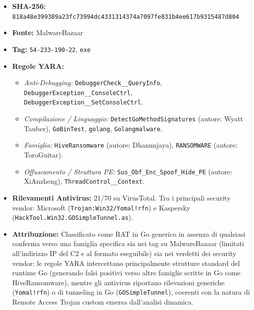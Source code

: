 \documentclass[11pt, a4paper]{article}
\begin{document}
	\begin{itemize}
		\item \textbf{SHA-256:} {\small\texttt{818a48e399389a23fc73994dc4331314374a7097fe831b4ee617b9315487d804}}
		\item \textbf{Fonte:} MalwareBazaar
		\item \textbf{Tag:} \texttt{54-\allowbreak{}233-\allowbreak{}190-\allowbreak{}22}, \texttt{exe}
		\item \textbf{Regole YARA:}
		\begin{itemize}
			\item \textit{Anti-Debugging:} \texttt{Debugger\allowbreak{}Check\_\_\allowbreak{}Query\allowbreak{}Info}, \texttt{Debugger\allowbreak{}Exception\_\_\allowbreak{}Console\allowbreak{}Ctrl}, \texttt{Debugger\allowbreak{}Exception\_\_\allowbreak{}Set\allowbreak{}Console\allowbreak{}Ctrl}.
			\item \textit{Compilazione / Linguaggio:} \texttt{Detect\allowbreak{}Go\allowbreak{}Method\allowbreak{}Signatures} (autore: Wyatt Tauber), \texttt{GoBinTest}, \texttt{golang}, \texttt{Golangmalware}.
			\item \textit{Famiglia:} \texttt{Hive\allowbreak{}Ransomware} (autore: Dhanunjaya), \texttt{RANSOMWARE} (autore: ToroGuitar).
			\item \textit{Offuscamento / Struttura PE:} \texttt{Sus\_\allowbreak{}Obf\_\allowbreak{}Enc\_\allowbreak{}Spoof\_\allowbreak{}Hide\_\allowbreak{}PE} (autore: XiAnzheng), \texttt{Thread\allowbreak{}Control\_\_\allowbreak{}Context}.
		\end{itemize}
		\item \textbf{Rilevamenti Antivirus:} 21/70 su VirusTotal. Tra i principali security vendor: Microsoft (\texttt{Trojan:Win32/\allowbreak{}Yomal!rfn}) e Kaspersky (\texttt{Hack\allowbreak{}Tool.\allowbreak{}Win32.\allowbreak{}GO\allowbreak{}Simple\allowbreak{}Tunnel.\allowbreak{}as}).
		\item \textbf{Attribuzione:} Classificato come RAT in Go generico in assenza di qualsiasi conferma verso una famiglia specifica sia nei tag su MalwareBazaar (limitati all'indirizzo IP del C2 e al formato eseguibile) sia nei verdetti dei security vendor: le regole YARA intercettano principalmente strutture standard del runtime Go (generando falsi positivi verso altre famiglie scritte in Go come HiveRansomware), mentre gli antivirus riportano rilevazioni generiche (\texttt{Yomal!rfn}) o di tunneling in Go (\texttt{GO\allowbreak{}Simple\allowbreak{}Tunnel}), coerenti con la natura di Remote Access Trojan custom emersa dall'analisi dinamica.
	\end{itemize}
	
\end{document}
